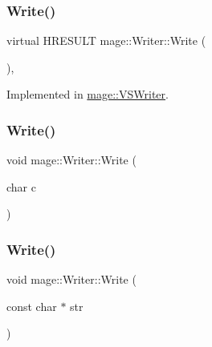\hypertarget{classmage_1_1_writer_a7ef124095098e7ea8f95e3be16499be3}{}\label{classmage_1_1_writer_a7ef124095098e7ea8f95e3be16499be3} 
\subsubsection{\texorpdfstring{Write()}{Write()}\hspace{0.1cm}{\footnotesize\ttfamily [1/3]}}
{\footnotesize\ttfamily virtual H\+R\+E\+S\+U\+LT mage\+::\+Writer\+::\+Write (\begin{DoxyParamCaption}{ }\end{DoxyParamCaption})\hspace{0.3cm}{\ttfamily [protected]}, {}}



Implemented in \hyperlink{classmage_1_1_v_s_writer_a1d106607f69bbd5989a259bbf60262fb}{mage\+::\+V\+S\+Writer}.

\hypertarget{classmage_1_1_writer_aa1d5d19391489a1a7dc5560de7a73141}{}\label{classmage_1_1_writer_aa1d5d19391489a1a7dc5560de7a73141} 
\subsubsection{\texorpdfstring{Write()}{Write()}\hspace{0.1cm}{\footnotesize\ttfamily [2/3]}}
{\footnotesize\ttfamily void mage\+::\+Writer\+::\+Write (\begin{DoxyParamCaption}\item[{char}]{c }\end{DoxyParamCaption})\hspace{0.3cm}{\ttfamily [protected]}}

\hypertarget{classmage_1_1_writer_a2ab7f0f1098bda12918598feb32cfb62}{}\label{classmage_1_1_writer_a2ab7f0f1098bda12918598feb32cfb62} 
\subsubsection{\texorpdfstring{Write()}{Write()}\hspace{0.1cm}{\footnotesize\ttfamily [3/3]}}
{\footnotesize\ttfamily void mage\+::\+Writer\+::\+Write (\begin{DoxyParamCaption}\item[{const char $\ast$}]{str }\end{DoxyParamCaption})\hspace{0.3cm}{\ttfamily [protected]}}

